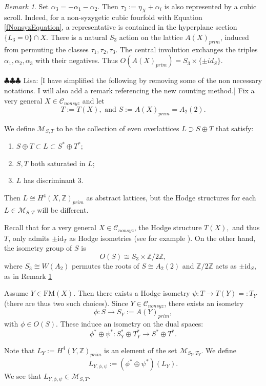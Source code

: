 \documentclass[11pt]{amsart}
\theoremstyle{plain}
\numberwithin{equation}{section}
\theoremstyle{definition}
\theoremstyle{remark}
\newtheorem{remark}[theorem]{Remark}
\newcommand{\id}{\mathrm{id}}
\newcommand{\bZ}{\mathbb{Z}}
\newcommand{\calC}{\mathcal{C}}
\newcommand{\calM}{\mathcal{M}}
\newcommand{\lisa}[1]{{\color{purple} \sf $\clubsuit\clubsuit\clubsuit$ Lisa: [#1]}}
\begin{document}
\begin{remark}\label{remark: symm}
    Set $\alpha_3=-\alpha_1-\alpha_2$. Then $\tau_3:=\eta_X+\alpha_i$ is also represented by a cubic scroll. Indeed, for a non-syzygetic cubic fourfold with Equation \ref{fNonsyzEquation}, a representative is contained in the hyperplane section  $\{L_3=0\}\cap X$. There is a natural $S_3$ action on the lattice $A(X)_{prim}$, induced from permuting the classes $\tau_1, \tau_2, \tau_3$. The central involution exchanges the triples $\alpha_1,\alpha_2, \alpha_3$ with their negatives. Thus $O(A(X)_{prim})=S_3\times \{\pm id_S\}.$
\end{remark}

\lisa{I have simplified the following by removing some of the non necessary notations. I will also add a remark referencing the new counting method.}
Fix a very general $X\in \calC_{nonsyz}$ and let 
$$T:=T(X), \text{ and } S:= A(X)_{prim}=A_2(2).$$

We define $\calM_{S,T}$ to be the collection of even overlattices $L\supset S\oplus T$ that satisfy:
\begin{enumerate}
    \item $S\oplus T\subset L\subset S^*\oplus T^*;$
    \item $S,T$ both saturated in $L$;
    \item $L$ has discriminant 3.
\end{enumerate}
Then $L\cong H^4(X,\bZ)_{prim}$ as abstract lattices, but the Hodge structures for each $L\in \calM_{S,T}$ will be different. 

Recall that for a very general $X\in \calC_{nonsyz}$, the Hodge structure $T(X),$ and thus $T$, only admits $\pm \id_T$ as Hodge isometries (see for example \cite[Section 14]{BFvGS}). On the other hand, the isometry group of $S$ is $$O(S)\cong S_3\times \bZ/2\bZ,$$ where $S_3\cong W(A_2)$ permutes the roots of $S\cong A_2(2)$ and $\bZ/2\bZ$ acts as $\pm \id_{S},$ as in Remark \ref{remark: symm}

Assume $Y\in \mathrm{FM}(X)$. Then there exists a Hodge isometry $\psi: T\rightarrow T(Y)= : T_Y$ (there are thus two such choices).
Since $Y\in \calC_{nonsyz}$, there exists an isometry $$\phi:S\rightarrow S_Y:=A(Y)_{prim},$$ with $\phi\in O(S).$
These induce an isometry on the dual spaces:
$$\phi^*\oplus \psi^*: S_Y^*\oplus T_Y^*\rightarrow S^*\oplus T^*.$$

Note that $L_Y:=H^4(Y,\bZ)_{prim}$ is an element of the set $\calM_{S_Y, T_Y}$. We define
$$L_{Y,\phi, \psi}:=(\phi^*\oplus \psi^*)(L_Y).$$
We see that $L_{Y,\phi,\psi}\in \calM_{S,T}$. 
\end{document}
